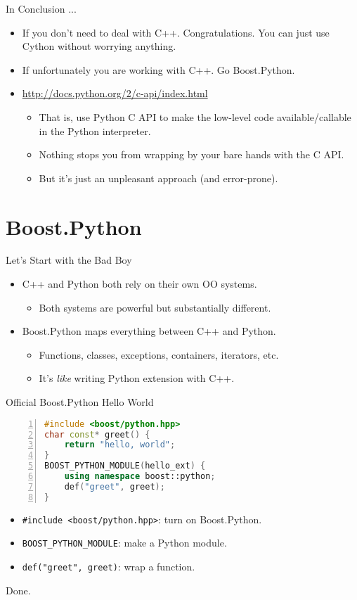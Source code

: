 \documentclass[dvips,xcolor=pst,14pt]{beamer}
\begin{document}
\begin{frame}{
%
In Conclusion ...
%
}
\begin{itemize}
\item If you don't need to deal with C++.  Congratulations.  You can just use
Cython without worrying anything.
\item If unfortunately you are working with C++.  Go Boost.Python.
\item {\small \url{http://docs.python.org/2/c-api/index.html}}
\begin{itemize}
  \item That is, use Python C API to make the low-level code available/callable
  in the Python interpreter.
  \item Nothing stops you from wrapping by your bare hands with the C API.
  \item But it's just an unpleasant approach (and error-prone).
\end{itemize}
\end{itemize}
\end{frame}

\section{
Boost.Python
}

\begin{frame}{
%
Let's Start with the Bad Boy
%
}
\begin{itemize}
\item C++ and Python both rely on their own OO systems.
\begin{itemize}
  \item Both systems are powerful but substantially different.
\end{itemize}
\item Boost.Python maps everything between C++ and Python.
\begin{itemize}
  \item Functions, classes, exceptions, containers, iterators, etc.
  \item It's \textit{like} writing Python extension with C++.
\end{itemize}
\end{itemize}
\end{frame}

\begin{frame}[fragile]{
%
Official Boost.Python Hello World
%
}
\begin{lstlisting}[basicstyle=\scriptsize\ttfamily,language=c++,numbers=left]
#include <boost/python.hpp>
char const* greet() {
    return "hello, world";
}
BOOST_PYTHON_MODULE(hello_ext) {
    using namespace boost::python;
    def("greet", greet);
}
\end{lstlisting}
\begin{itemize}
\item \verb+#include <boost/python.hpp>+: turn on Boost.Python.
\item \verb+BOOST_PYTHON_MODULE+: make a Python module.
\item \verb+def("greet", greet)+: wrap a function.
\end{itemize}
Done.
\end{frame}
\end{document}
